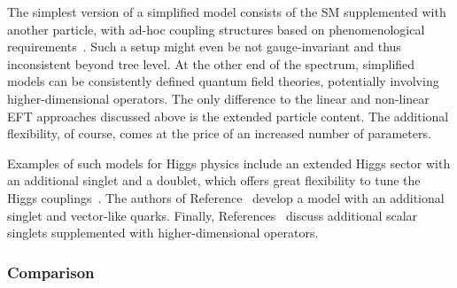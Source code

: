 The simplest version of a simplified model consists of the SM
supplemented with another particle, with ad-hoc coupling structures
based on phenomenological requirements~\cite{Biekotter:2016ecg}. Such
a setup might even be not gauge-invariant and thus inconsistent beyond
tree level. At the other end of the spectrum, simplified models can be
consistently defined quantum field theories, potentially involving
higher-dimensional operators. The only difference to the linear and
non-linear EFT approaches discussed above is the extended particle
content. The additional flexibility, of course, comes at the price of an
increased number of parameters.

Examples of such models for Higgs physics include an extended Higgs
sector with an additional singlet and a doublet, which offers great
flexibility to tune the Higgs couplings~\cite{Lopez-Val:2013yba}. The
authors of Reference~\cite{Dolan:2016eki} develop a model with an
additional singlet and vector-like quarks. Finally,
References~\cite{Gripaios:2016xuo, Bauer:2016hcu} discuss additional
scalar singlets supplemented with higher-dimensional operators.



\subsubsection{Comparison}

